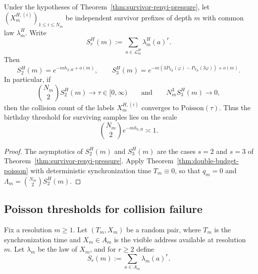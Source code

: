 \begin{corollary}
\label{cor:survivor-spectrum-collision}
Under the hypotheses of
Theorem~\ref{thm:survivor-renyi-pressure}, let
\((X_m^{H,(i)})_{1\leq i\leq N_m}\) be independent survivor prefixes of
depth \(m\) with common law \(\lambda_m^H\).  Write
\[
  S_r^H(m):=\sum_{a\in\mathcal L_m^H}\lambda_m^H(a)^r.
\]
Then
\[
  S_2^H(m)=e^{-m h_{2,H}+o(m)},
  \qquad
  S_3^H(m)
  = e^{-m(3P_{Y_H}(\varphi)-P_{Y_H}(3\varphi))+o(m)}.
\]
In particular, if
\[
  \binom{N_m}{2}S_2^H(m)\to\tau\in[0,\infty)
  \qquad\text{and}\qquad
  N_m^3S_3^H(m)\to 0,
\]
then the collision count of the labels \(X_m^{H,(i)}\) converges to
\(\mathrm{Poisson}(\tau)\).  Thus the birthday threshold for surviving
samples lies on the scale
\[
  \binom{N_m}{2}e^{-m h_{2,H}}\asymp 1.
\]
\end{corollary}

\begin{proof}
The asymptotics of \(S_2^H(m)\) and \(S_3^H(m)\) are the cases \(s=2\)
and \(s=3\) of Theorem~\ref{thm:survivor-renyi-pressure}.  Apply
Theorem~\ref{thm:double-budget-poisson} with deterministic synchronization
time \(T_m\equiv 0\), so that \(q_m=0\) and
\(\Lambda_m=\binom{N_m}{2}S_2^H(m)\).
\end{proof}

\subsection{Poisson thresholds for collision failure}

Fix a resolution \(m\geq 1\).  Let \((T_m,X_m)\) be a random pair,
where \(T_m\) is the synchronization time and \(X_m\in A_m\) is the
visible address available at resolution \(m\).  Let \(\lambda_m\) be the
law of \(X_m\), and for \(r\geq 2\) define
\[
  S_r(m):=\sum_{a\in A_m}\lambda_m(a)^r.
\]


